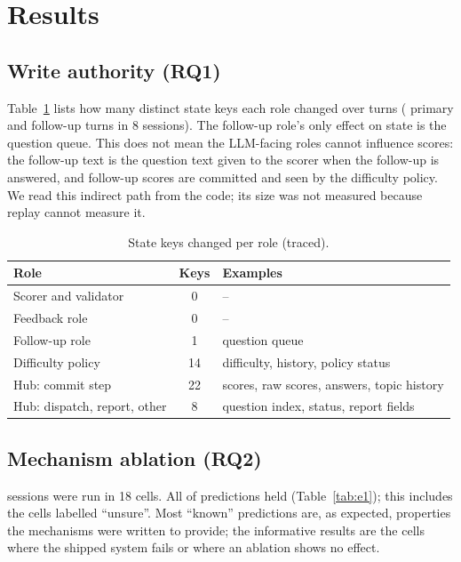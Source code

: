 \documentclass[runningheads]{llncs}
\begin{document}
\section{Results}
\subsection{Write authority (RQ1)}\label{sec:authority}
Table~\ref{tab:auth} lists how many distinct state keys each role changed over \nTurns{} turns (\nPrimary{} primary and \nFU{} follow-up turns in 8 sessions). The follow-up role's only effect on state is the question queue. This does not mean the LLM-facing roles cannot influence scores: the follow-up text is the question text given to the scorer when the follow-up is answered, and follow-up scores are committed and seen by the difficulty policy. We read this indirect path from the code; its size was not measured because replay cannot measure it.

\begin{table}[t]
\caption{State keys changed per role (traced).}\label{tab:auth}
\centering\small
\begin{tabular}{lcl}
\toprule
Role & Keys & Examples\\
\midrule
Scorer and validator & 0 & --\\
Feedback role & 0 & --\\
Follow-up role & 1 & question queue\\
Difficulty policy & 14 & difficulty, history, policy status\\
Hub: commit step & 22 & scores, raw scores, answers, topic history\\
Hub: dispatch, report, other & 8 & question index, status, report fields\\
\bottomrule
\end{tabular}
\end{table}

\subsection{Mechanism ablation (RQ2)}\label{sec:e1}
\eOneSessions{} sessions were run in 18 cells. All \predMatch{} of \predTotal{} predictions held (Table~\ref{tab:e1}); this includes the cells labelled ``unsure''. Most ``known'' predictions are, as expected, properties the mechanisms were written to provide; the informative results are the cells where the shipped system fails or where an ablation shows no effect.
\end{document}
